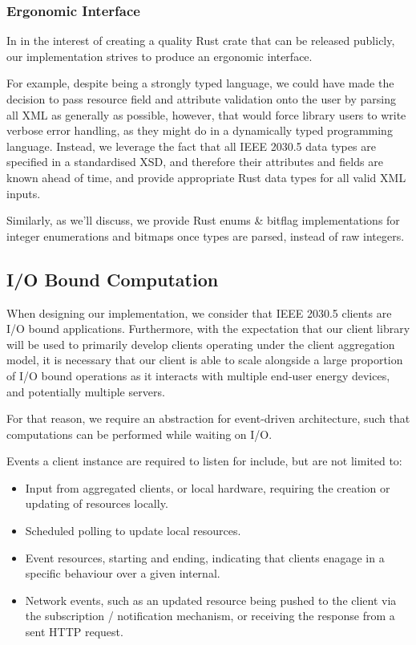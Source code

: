 \subsubsection{Ergonomic Interface}

In in the interest of creating a quality Rust crate that can be released publicly, our implementation strives to produce an ergonomic interface. 

For example, despite being a strongly typed language, we could have made the decision to pass resource field and attribute validation onto the user by parsing all XML as generally as possible, however, that would force library users to write verbose error handling, as they might do in a dynamically typed programming language. Instead, we leverage the fact that all IEEE 2030.5 data types are specified in a standardised XSD, and therefore their attributes and fields are known ahead of time, and provide appropriate Rust data types for all valid XML inputs.

Similarly, as we'll discuss, we provide Rust enums \& bitflag implementations for integer enumerations and bitmaps once types are parsed, instead of raw integers.

\subsection{I/O Bound Computation}
When designing our implementation, we consider that IEEE 2030.5 clients are I/O bound applications. Furthermore, with the expectation that our client library will be used to primarily develop clients operating under the client aggregation model, it is necessary that our client is able to scale alongside a large proportion of I/O bound operations as it interacts with multiple end-user energy devices, and potentially multiple servers.

For that reason, we require an abstraction for event-driven architecture, such that computations can be performed while waiting on I/O.

Events a client instance are required to listen for include, but are not limited to:

\begin{itemize}
    \item Input from aggregated clients, or local hardware, requiring the creation or updating of resources locally.
    \item Scheduled polling to update local resources.
    \item Event resources, starting and ending, indicating that clients enagage in a specific behaviour over a given internal.
    \item Network events, such as an updated resource being pushed to the client via the subscription / notification mechanism, or receiving the response from a sent HTTP request.
\end{itemize}


